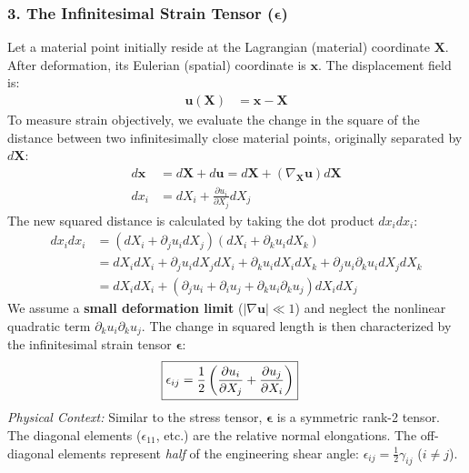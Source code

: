 \subsubsection*{3. The Infinitesimal Strain Tensor ($\mathbf{\epsilon}$)}
Let a material point initially reside at the Lagrangian (material) coordinate $\mathbf{X}$. After deformation, its Eulerian (spatial) coordinate is $\mathbf{x}$. The displacement field is:
\begin{align}
    \mathbf{u}(\mathbf{X}) &= \mathbf{x} - \mathbf{X}
\end{align}
To measure strain objectively, we evaluate the change in the square of the distance between two infinitesimally close material points, originally separated by $d\mathbf{X}$:
\begin{align}
    d\mathbf{x} &= d\mathbf{X} + d\mathbf{u} = d\mathbf{X} + (\nabla_{\mathbf{X}} \mathbf{u}) d\mathbf{X} \nonumber \\
    dx_i &= dX_i + \frac{\partial u_i}{\partial X_j} dX_j
\end{align}
The new squared distance is calculated by taking the dot product $dx_i dx_i$:
\begin{align}
    dx_i dx_i &= \left(dX_i + \partial_j u_i dX_j\right) \left(dX_i + \partial_k u_i dX_k\right) \nonumber \\
    &= dX_i dX_i + \partial_j u_i dX_j dX_i + \partial_k u_i dX_i dX_k + \partial_j u_i \partial_k u_i dX_j dX_k \nonumber \\
    &= dX_i dX_i + \left( \partial_j u_i + \partial_i u_j + \partial_k u_i \partial_k u_j \right) dX_i dX_j
\end{align}
We assume a \textbf{small deformation limit} ($|\nabla \mathbf{u}| \ll 1$) and neglect the nonlinear quadratic term $\partial_k u_i \partial_k u_j$. The change in squared length is then characterized by the infinitesimal strain tensor $\mathbf{\epsilon}$:
\begin{align}
    \Aboxed{ \epsilon_{ij} &= \frac{1}{2} \left( \frac{\partial u_i}{\partial X_j} + \frac{\partial u_j}{\partial X_i} \right) }
\end{align}
\textit{Physical Context:} Similar to the stress tensor, $\mathbf{\epsilon}$ is a symmetric rank-2 tensor. The diagonal elements ($\epsilon_{11}$, etc.) are the relative normal elongations. The off-diagonal elements represent \emph{half} of the engineering shear angle: $\epsilon_{ij} = \frac{1}{2} \gamma_{ij}$ ($i \neq j$). 

